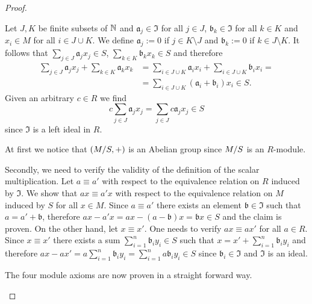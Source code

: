\begin{proof}
\begin{plist}
\item Let $J,K$ be finite subsets of $\N$ and $\mathfrak{a}_j\in \mathfrak{I}$ for all $j\in J$, $\mathfrak{b}_k\in \mathfrak{I}$ for all $k\in K$ and  $x_i\in M$ for all $i\in J\cup K$. We define $\mathfrak{a}_j:=0$ if $j\in K \setminus J$ and $\mathfrak{b}_k:=0$ if $k\in J\setminus K$. It follows that $\sum_{j\in J}\mathfrak{a}_jx_j\in S$, $\sum_{k\in K}\mathfrak{b}_kx_k\in S$ and therefore
\begin{align*}
\sum_{j\in J}\mathfrak{a}_jx_j+\sum_{k\in K}\mathfrak{a}_kx_k &= \sum_{i\in J\cup K} \mathfrak{a}_ix_i+\sum_{i\in J\cup K} \mathfrak{b}_ix_i=\\
    &=\sum_{i\in J\cup K} (\mathfrak{a}_i+\mathfrak{b}_i)x_i\in S.
\end{align*} 
Given an arbitrary $c\in R$ we find
 \[c\sum_{j\in J}\mathfrak{a}_jx_j=\sum_{j\in J}c\mathfrak{a}_jx_j\in S\]
since $\mathfrak{I}$ is a left ideal in $R$.
\item At first we notice that $(\nicefrac{M}{S}, +)$ is an Abelian group since $\nicefrac{M}{S}$ is an $R$-module.

Secondly, we need to verify the validity of the definition of the scalar multiplication. Let $a\equiv a'$ with respect to the equivalence relation on $R$ induced by $\mathfrak{I}$. We show that $ax\equiv a'x$ with respect to the equivalence relation on $M$ induced by $S$ for all $x\in M$. Since $a\equiv a'$ there exists an element $\mathfrak{b}\in\mathfrak{I}$ such that $a=a'+\mathfrak{b}$, therefore $ax-a'x=ax-(a-\mathfrak{b})x=\mathfrak{b}x\in S$ and the claim is proven. On the other hand, let $x\equiv x'$. One needs to verify $ax\equiv ax'$ for all $a\in R$. Since $x\equiv x'$ there exists a sum $\sum_{i=1}^n\mathfrak{b}_iy_i\in S$ such that $x=x'+\sum_{i=1}^n\mathfrak{b}_iy_i$ and therefore $ax-ax'=a\sum_{i=1}^n\mathfrak{b}_iy_i=\sum_{i=1}^na\mathfrak{b}_iy_i\in S$ since $\mathfrak{b}_i\in\mathfrak{I}$ and $\mathfrak{I}$ is an ideal.

The four module axioms are now proven in a straight forward way.
\end{plist}
\end{proof}

